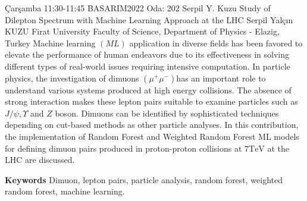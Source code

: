 
    \begin{abstract_basarim}
    {Çarşamba 11:30-11:45}
    {BASARIM2022}
    {Oda: 202}
    {Serpil Y. Kuzu}
    {Study of Dilepton Spectrum with Machine Learning Approach at the LHC}
    {%
    Serpil Yalçın KUZU}
    {%
    }
    {%
    Firat University Faculty of Science, Department of Physics - Elazig, Turkey}
    Machine learning $(M L)$ application in diverse fields has been favored to elevate the performance of human endeavors due to its effectiveness in solving different types of real-world issues requiring intensive computation. In particle physics, the investigation of dimuons $\left(\mu^{+} \mu^{-}\right)$has an important role to understand various systems produced at high energy collisions. The absence of strong interaction makes these lepton pairs suitable to examine particles such as $J / \psi, \Upsilon$ and $Z$ boson. Dimuons can be identified by sophisticated techniques depending on cut-based methods as other particle analyses. In this contribution, the implementation of Random Forest and Weighted Random Forest ML models for defining dimuon pairs produced in proton-proton collisions at $7 \mathrm{TeV}$ at the LHC are discussed. 
    
        \textbf{Keywords} \newline{}Dimuon, lepton pairs, particle analysis, random forest, weighted random forest, machine learning.
    \end{abstract_basarim}
    